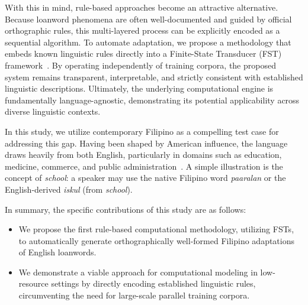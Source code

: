With this in mind, rule-based approaches become an attractive alternative.
Because loanword phenomena are often well-documented and guided by official
orthographic rules, this multi-layered process can be explicitly encoded as a
sequential algorithm. To automate adaptation, we propose a methodology that
embeds known linguistic rules directly into a Finite-State Transducer (FST)
framework~\cite{mao2016}. By operating independently of training corpora, the proposed system
remains transparent, interpretable, and strictly consistent with established
linguistic descriptions. Ultimately, the underlying computational engine is
fundamentally language-agnostic, demonstrating its potential applicability
across diverse linguistic contexts. 

In this study, we utilize contemporary
Filipino as a compelling test case for addressing this gap.
Having been shaped by American influence, the language draws heavily from both English, particularly in domains such as education, medicine,
commerce, and public administration~\cite{baklanova2017}. A simple illustration
is the concept of \emph{school}: a speaker may use the native Filipino word
\emph{paaralan} or the English-derived \emph{iskul} (from \emph{school}).

In summary, the specific contributions of this study are as follows:
\begin{itemize}
    \item We propose the first rule-based computational methodology, utilizing
          FSTs, to automatically generate orthographically
          well-formed Filipino adaptations of English loanwords.
    \item We demonstrate a viable approach for computational modeling in low-resource
          settings by directly encoding established linguistic rules, circumventing the
          need for large-scale parallel training corpora.
\end{itemize}